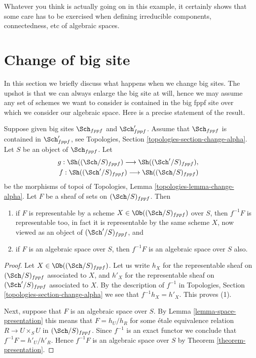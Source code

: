 \noindent
Whatever you think is actually going on in this example, it certainly
shows that some care has to be exercised when defining irreducible
components, connectedness, etc of algebraic spaces.






\section{Change of big site}
\label{section-change-big-site}

\noindent
In this section we briefly discuss what happens when we change big sites.
The upshot is that we can always enlarge the big site at will, hence we
may assume any set of schemes we want to consider is contained in the big
fppf site over which we consider our algebraic space. Here is a precise
statement of the result.

\begin{lemma}
\label{lemma-change-big-site}
Suppose given big sites $\Sch_{fppf}$ and $\Sch'_{fppf}$.
Assume that $\Sch_{fppf}$ is contained in $\Sch'_{fppf}$,
see Topologies, Section \ref{topologies-section-change-alpha}.
Let $S$ be an object of $\Sch_{fppf}$. Let
\begin{align*}
g : \Sh((\Sch/S)_{fppf})
\longrightarrow
\Sh((\Sch'/S)_{fppf}), \\
f : \Sh((\Sch'/S)_{fppf})
\longrightarrow
\Sh((\Sch/S)_{fppf})
\end{align*}
be the morphisms of topoi of
Topologies, Lemma \ref{topologies-lemma-change-alpha}.
Let $F$ be a sheaf of sets on $(\Sch/S)_{fppf}$. Then
\begin{enumerate}
\item if $F$ is representable by a scheme
$X \in \Ob((\Sch/S)_{fppf})$ over $S$,
then $f^{-1}F$ is representable too, in fact it is representable by the
same scheme $X$, now viewed as an object of $(\Sch'/S)_{fppf}$, and
\item if $F$ is an algebraic space over $S$, then $f^{-1}F$ is an algebraic
space over $S$ also.
\end{enumerate}
\end{lemma}

\begin{proof}
Let $X \in \Ob((\Sch/S)_{fppf})$. Let us write $h_X$ for the
representable sheaf on $(\Sch/S)_{fppf}$ associated to $X$, and
$h'_X$ for the representable sheaf on $(\Sch'/S)_{fppf}$ associated to
$X$. By the description of $f^{-1}$ in
Topologies, Section \ref{topologies-section-change-alpha}
we see that $f^{-1}h_X = h'_X$. This proves (1).

\medskip\noindent
Next, suppose that $F$
is an algebraic space over $S$. By Lemma \ref{lemma-space-presentation}
this means that $F = h_U/h_R$ for some \'etale equivalence relation
$R \to U \times_S U$ in $(\Sch/S)_{fppf}$. Since $f^{-1}$ is an
exact functor we conclude that $f^{-1}F = h'_U/h'_R$. Hence
$f^{-1}F$ is an algebraic space over $S$ by Theorem \ref{theorem-presentation}.
\end{proof}


